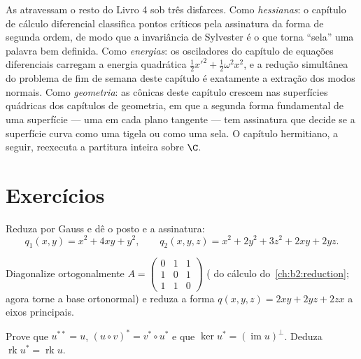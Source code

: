 \begin{remark}
As  atravessam o resto do Livro 4 sob três
disfarces. Como \emph{hessianas}: o capítulo de cálculo diferencial
classifica pontos críticos pela assinatura da forma de
segunda ordem, de modo que a invariância de Sylvester é o que torna
``sela'' uma palavra bem definida. Como \emph{energias}: os
osciladores do capítulo de equações diferenciais carregam a
energia quadrática $\frac12x'^2 + \frac12\omega^2x^2$, e a
redução simultânea do problema de fim de semana deste capítulo é
exatamente a extração dos modos normais. Como \emph{geometria}:
as cônicas deste capítulo crescem nas superfícies quádricas dos
capítulos de geometria, em que a segunda forma fundamental de uma
superfície --- uma  em cada plano tangente --- tem
assinatura que decide se a superfície curva como uma tigela ou
como uma sela. O capítulo hermitiano, a seguir, reexecuta a partitura
inteira sobre $\C$.
\end{remark}

\section{Exercícios}

\begin{exercise}[$\star$]\label{exo:b2:quadratic:1}
Reduza por Gauss e dê o posto e a assinatura:
\[
q_1(x,y) = x^2 + 4xy + y^2,
\qquad
q_2(x,y,z) = x^2 + 2y^2 + 3z^2 + 2xy + 2yz .
\]
\end{exercise}

\begin{exercise}[$\star$]\label{exo:b2:quadratic:2}
Diagonalize ortogonalmente $A = \begin{pmatrix} 0 & 1 & 1\\ 1 & 0 &
1\\ 1 & 1 & 0\end{pmatrix}$ ( do
cálculo do~\cref{ch:b2:reduction}; agora torne a base
ortonormal) e reduza a forma $q(x,y,z) = 2xy + 2yz + 2zx$ a
eixos principais.
\end{exercise}

\begin{exercise}[$\star$]\label{exo:b2:quadratic:3}
Prove que $u^{**} = u$, $(u \circ v)^* = v^* \circ u^*$ e que
$\ker u^* = (\operatorname{im} u)^{\perp}$. Deduza
$\operatorname{rk} u^* = \operatorname{rk} u$.
\end{exercise}

